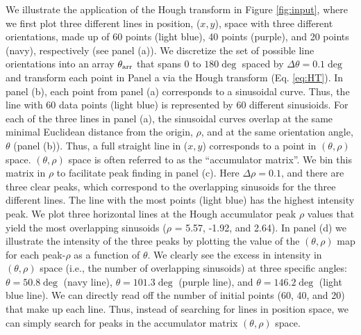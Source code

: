 \documentclass[twocolumn]{aastex631}
\begin{document}
We illustrate the application of the Hough transform in Figure \ref{fig:input}, where we first plot three different lines in position, ($x,y$), space with three different orientations, made up of 60 points (light blue), 40 points (purple), and 20 points (navy), respectively (see panel (a)). We discretize the set of possible line orientations into an array $\theta_{\rm arr}$ that spans $0$ to $180 \deg$ spaced by $\Delta \theta = 0.1\deg$ and transform each point in Panel a via the Hough transform (Eq. \ref{eq:HT}). In panel (b), each point from panel (a) corresponds to a sinusoidal curve. Thus, the line with 60 data points (light blue) is represented by 60 different sinusioids. For each of the three lines in panel (a), the sinusoidal curves overlap at the same minimal Euclidean distance from the origin, $\rho$, and at the same orientation angle, $\theta$ (panel (b)). Thus, a full straight line in ($x,y$) corresponds to a point in $(\theta,\rho)$ space. $(\theta,\rho)$ space is often referred to as the ``accumulator matrix''. We bin this matrix in $\rho$ to facilitate peak finding in panel (c). Here $\Delta\rho = 0.1$, and there are three clear peaks, which correspond to the overlapping sinusoids for the three different lines. The line with the most points (light blue) has the highest intensity peak. 
We plot three horizontal lines at the Hough accumulator peak $\rho$ values that yield the most overlapping sinusoids ($\rho$ = 5.57, -1.92, and 2.64). In panel (d) we illustrate the intensity of the three peaks by plotting the value of the $(\theta,\rho)$ map for each peak-$\rho$ as a function of $\theta$. We clearly see the excess in intensity in $(\theta,\rho)$ space (i.e., the number of overlapping sinusoids) at three specific angles: $\theta = 50.8 \deg$ (navy line), $\theta =  101.3 \deg$ (purple line), and $\theta = 146.2 \deg$ (light blue line). We can directly read off the number of initial points (60, 40, and 20) that make up each line. Thus, instead of searching for lines in position space, we can simply search for peaks in the accumulator matrix $(\theta,\rho)$ space. 
\end{document}

